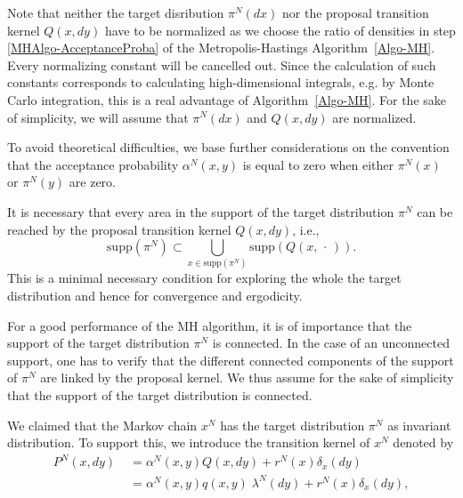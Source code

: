 \begin{rem}
\label{Rem-Omitting constants in densities}
 Note that neither the target disribution $ \pi^{N}(dx) $ nor the proposal transition kernel $ Q(x,dy) $ have to be normalized as we choose the ratio of densities in step \ref{MHAlgo-AcceptanceProba} of the Metropolis-Hastings Algorithm~\ref{Algo-MH}. Every normalizing constant will be cancelled out. Since the calculation of such constants corresponds to calculating high-dimensional integrals, e.g. by Monte Carlo integration, this is a real advantage of Algorithm~\ref{Algo-MH}. For the sake of simplicity, we will assume that $ \pi^{N}(dx) $ and $ Q(x,dy) $ are normalized.
\end{rem}

To avoid theoretical difficulties, we base further considerations on the convention that the acceptance probability $ \alpha^{N}(x,y) $ is equal to zero when either $ \pi^{N}(x) $ or $ \pi^{N}(y) $ are zero.

\begin{rem}
\label{Rem-SupportOfProposals}
It is necessary that every area in the support of the target distribution $ \pi^{N} $ can be reached by the proposal transition kernel $ Q(x,dy) $, i.e.,
\begin{equation*}
 \text{supp} (\pi^{N}) \subset \bigcup_{x \in \text{supp} (\pi^{N}) } \text{supp} (Q(x, \, \cdot \,)).
\end{equation*}
This is a minimal necessary condition for exploring the whole the target distribution and hence for convergence and ergodicity.

For a good performance of the MH algorithm, it is of importance that the support of the target distribution $ \pi^{N} $ is connected. In the case of an unconnected support, one has to verify that the different connected components of the support of $ \pi^{N} $ are linked by the proposal kernel. We thus assume for the sake of simplicity that the support of the target distribution is connected.
\end{rem}


We claimed that the Markov chain $ x^{N} $ has the target distribution $ \pi^{N} $ as invariant distribution. To support this, we introduce the transition kernel of $ x^{N} $ denoted by
\begin{equation}
\label{MH-TransitionKernelOfMHChain}
\begin{split}
 P^{N}(x,dy) & \; = \alpha^{N}(x,y) Q(x, dy) + r^{N}(x)\delta_{x}(dy) \\
 & \; = \alpha^{N}(x,y) q(x,y) \; \lambda^{N}(dy) + r^{N}(x)\delta_{x}(dy),
\end{split}
\end{equation}

